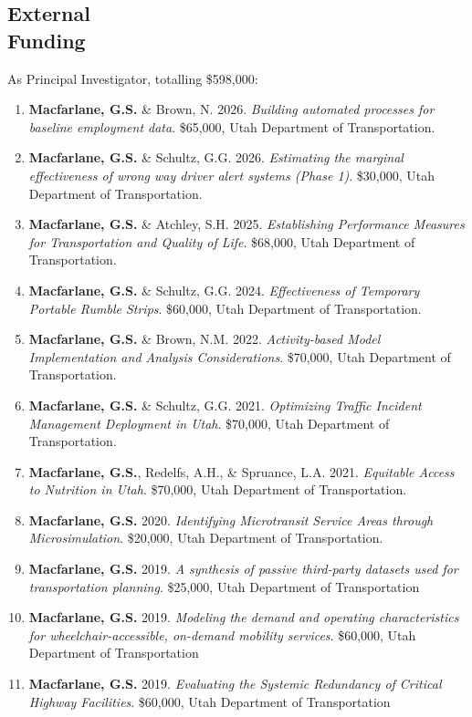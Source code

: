 \documentclass[margin,line]{res}
\newif\ifdetail{}
\newcounter{enuminitialize}
\newenvironment{myenum}[1][]
{%
 \setcounter{enuminitialize}{#1}
 \addtocounter{enuminitialize}{2}
 \begin{enumerate}[left= 4pt, itemsep=8pt, start=\value{enuminitialize}, label=\arabic*\addtocounter{enumi}{-2}]
}
{%
 \end{enumerate}
}
\begin{document}
\begin{resume}
\section{External \\Funding}

As Principal Investigator, totalling \$598,000:
\vspace{0.3cm}
\begin{myenum}[11]
  \ifdetail {\color{NavyBlue} \fi
  \item {\textbf{Macfarlane, G.S.} \& Brown, N. 2026. \textit{Building automated processes for baseline employment data}. \$65,000, Utah Department of Transportation.}
  \item {\textbf{Macfarlane, G.S.} \& Schultz, G.G. 2026. \textit{Estimating the marginal effectiveness of wrong way driver alert systems (Phase 1)}. \$30,000, Utah Department of Transportation.}
  \ifdetail } \fi
  \item {\textbf{Macfarlane, G.S.} \& Atchley, S.H. 2025. \textit{Establishing Performance Measures for Transportation and Quality of Life}. \$68,000, Utah Department of Transportation.}
  \item {\textbf{Macfarlane, G.S.} \& Schultz, G.G. 2024. \textit{Effectiveness of Temporary Portable Rumble Strips}. \$60,000, Utah Department of Transportation.}
  \item {\textbf{Macfarlane, G.S.} \& Brown, N.M. 2022. \textit{Activity-based Model Implementation and Analysis Considerations}. \$70,000, Utah Department of Transportation.}
  \item {\textbf{Macfarlane, G.S.} \& Schultz, G.G. 2021. \textit{Optimizing Traffic Incident Management Deployment in Utah}. \$70,000, Utah Department of Transportation.}
  \item {\textbf{Macfarlane, G.S.}, Redelfs, A.H., \& Spruance, L.A. 2021. \textit{Equitable Access to Nutrition in Utah}. \$70,000, Utah Department of Transportation.}
  \item {\textbf{Macfarlane, G.S.} 2020. \textit{ Identifying Microtransit Service Areas through Microsimulation}. \$20,000, Utah Department of Transportation.}
  \item {\textbf{Macfarlane, G.S.} 2019. \textit{ A synthesis of passive third-party datasets used for transportation planning}. \$25,000, Utah Department of Transportation}
  \item {\textbf{Macfarlane, G.S.} 2019. \textit{ Modeling the demand and operating characteristics for wheelchair-accessible, on-demand mobility services}.  \$60,000, Utah Department of Transportation}
  \item {\textbf{Macfarlane, G.S.} 2019. \textit{ Evaluating the Systemic Redundancy of Critical Highway Facilities}. \$60,000, Utah Department of Transportation}
\end{myenum}


\end{resume}
\end{document}
